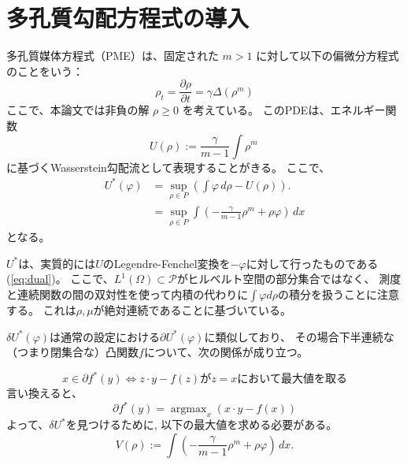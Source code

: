 \section{多孔質勾配方程式の導入}
\label{sect:多孔質勾配方程式の導入}
多孔質媒体方程式（PME）は、固定された \(m > 1\) に対して以下の偏微分方程式のことをいう：
\[
\rho_t = \frac{{\partial \rho}}{{\partial t}} = \gamma\Delta (\rho^m)
\]
ここで、本論文では非負の解 \(\rho \geq 0\) を考えている。
このPDEは、エネルギー関数
\[
    U(\rho) := \frac{\gamma}{{m-1}} \int \rho^m \, 
\]
に基づくWasserstein勾配流として表現することがきる。
ここで、
\begin{align*}
    U^*(\varphi) &= \sup_{\rho \in P} \left( \int \varphi \, d\rho - U(\rho) \right).\\
                &= \sup_{\rho \in P} \int \left(- \frac{\gamma}{m-1}\rho^m + \rho\varphi\right) \, dx
\end{align*}
となる。

$U^*$は、実質的には$U$のLegendre-Fenchel変換を$-\varphi$に対して行ったものである(\ref{eq:dual})。
ここで、$L^1(\Omega) \subset \mathcal{P}$がヒルベルト空間の部分集合ではなく、
測度と連続関数の間の双対性を使って内積の代わりに$\int \varphi d \rho$の積分を扱うことに注意する。
これは$\rho, \mu$が絶対連続であることに基づいている。


$\delta U^*(\varphi)$は通常の設定における$\partial U^*(\varphi)$に類似しており、
その場合下半連続な（つまり閉集合な）凸関数$f$について、次の関係が成り立つ。

\[
    x \in \partial f^*(y) \iff z \cdot y - f(z) \text{が} z = x \text{において最大値を取る}
\]
言い換えると、
\[
    \partial f^*(y) = \operatorname{argmax}_x (x \cdot y - f(x))
\]
よって、$\delta U^*$を見つけるために, 以下の最大値を求める必要がある。
\[
    V(\rho) := \int \left(- \frac{\gamma}{m-1}\rho^m + \rho\varphi\right) \, dx.
\]

